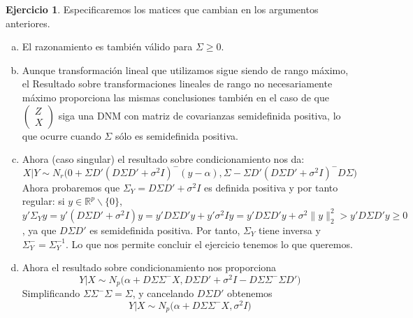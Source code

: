 \documentclass[12pt,spanish]{article}
\theoremstyle{definition}
\newtheorem{exercise}{Ejercicio}
\begin{document}
\begin{exercise} \label{ej2} %
  Especificaremos los matices que cambian en los argumentos
  anteriores.
  \begin{enumerate}[a)] 
  \item El razonamiento es también válido para $\Sigma\geq 0$.
  \item Aunque transformación lineal que utilizamos sigue siendo de
    rango máximo, el Resultado sobre transformaciones lineales de
    rango no necesariamente máximo proporciona las mismas conclusiones
    también en el caso de que $
    \begin{pmatrix}
      Z \\ X
    \end{pmatrix}$ siga una DNM con matriz de covarianzas semidefinida
    positiva, lo que ocurre cuando $\Sigma$ sólo es semidefinida
    positiva.
  \item Ahora (caso singular) el resultado sobre condicionamiento nos
    da:
    \[X|Y\sim N_r\Big(0+\Sigma D'(D\Sigma
      D'+\sigma^2I)^-(y-\alpha),\Sigma-\Sigma D'(D\Sigma
      D'+\sigma^2I)^-D\Sigma\Big)\] Ahora probaremos que
    $\Sigma_Y=D\Sigma D'+\sigma^2I$ es definida positiva y por tanto
    regular: si $y\in \mathbb{R}^p\backslash\{0\}$,
    $y'\Sigma_Y y=y'(D\Sigma D'+\sigma^2I)y=y'D\Sigma
    D'y+y'\sigma^2Iy=y'D\Sigma D'y+\sigma^2\|y\|_2^2>y'D\Sigma D'y\geq
    0$, ya que $D\Sigma D'$ es semidefinida positiva. Por tanto,
    $\Sigma_Y$ tiene inversa y $\Sigma_Y^-=\Sigma_Y^{-1}$. Lo que nos
    permite concluir el ejercicio tenemos lo que queremos.
  \item Ahora el resultado sobre condicionamiento nos proporciona
    \[Y|X\sim N_p\Big(\alpha+D\Sigma\Sigma^-X,D\Sigma
      D'+\sigma^2I-D\Sigma\Sigma^-\Sigma D'\Big)\] Simplificando
    $\Sigma\Sigma^-\Sigma=\Sigma$, y cancelando $D\Sigma D'$ obtenemos
    \[Y|X\sim N_p\Big(\alpha+D\Sigma\Sigma^-X,\sigma^2I\Big)\]
  \end{enumerate}
\end{exercise}
\end{document}
